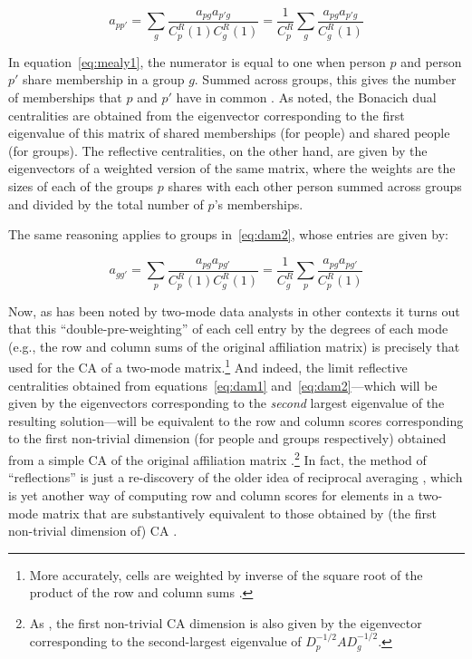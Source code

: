 \documentclass[a4paper,fleqn]{cas-sc}
\begin{document}
\begin{equation}
    a_{pp'} = \sum_g\frac{a_{pg}a_{p'g}}{C^R_p(1)C^R_g(1)} = 
    \frac{1}{C^R_p}\sum_g\frac{a_{pg}a_{p'g}}{C^R_g(1)}
    \label{eq:mealy1}
\end{equation}

In equation~\ref{eq:mealy1}, the numerator is equal to one when person $p$ and person $p'$ share membership in a group $g$. Summed across groups, this gives the number of memberships that $p$ and $p'$ have in common \citep{breiger1974duality}. As noted, the Bonacich dual centralities are obtained from the eigenvector corresponding to the first eigenvalue of this matrix of shared memberships (for people) and shared people (for groups). The reflective centralities, on the other hand, are given by the eigenvectors of a weighted version of the same matrix, where the weights are the sizes of each of the groups $p$ shares with each other person summed across groups and divided by the total number of $p$'s memberships. 

The same reasoning applies to groups in~\ref{eq:dam2}, whose entries are given by:

\begin{equation}
    a_{gg'} = \sum_p\frac{a_{pg}a_{pg'}}{C^R_p(1)C^R_g(1)} = 
    \frac{1}{C^R_g}\sum_p\frac{a_{pg}a_{pg'}}{C^R_p(1)}
    \label{eq:mealy2}
\end{equation}

Now, as has been noted by two-mode data analysts in other contexts \citep[e.g.,][]{faust2005using} it turns out that this ``double-pre-weighting'' of each cell entry by the degrees of each mode (e.g., the row and column sums of the original affiliation matrix) is precisely that used for the CA of a two-mode matrix.\footnote{More accurately, cells are weighted by inverse of the square root of the product of the row and column sums \citep[e.g.,][124]{faust2005using}.} And indeed, the limit reflective centralities obtained from equations~\ref{eq:dam1} and~\ref{eq:dam2}---which will be given by the eigenvectors corresponding to the \textit{second} largest eigenvalue of the resulting solution---will be equivalent to the row and column scores corresponding to the first non-trivial dimension (for people and groups respectively) obtained from a simple CA of the original affiliation matrix \citep[398, eq. 9.17]{fouss2016algorithms}.\footnote{As \citet[126]{faust2005using}, the first non-trivial CA dimension is also given by the eigenvector corresponding to the second-largest eigenvalue of $D_p^{-1/2}AD_g^{-1/2}$.} In fact, the method of ``reflections'' is just a re-discovery of the older idea of reciprocal averaging \citep{hill1973reciprocal}, which is yet another way of computing row and column scores for elements in a two-mode matrix that are substantively equivalent to those obtained by (the first non-trivial dimension of) CA \citep{mealy2019interpreting}.
\end{document}

